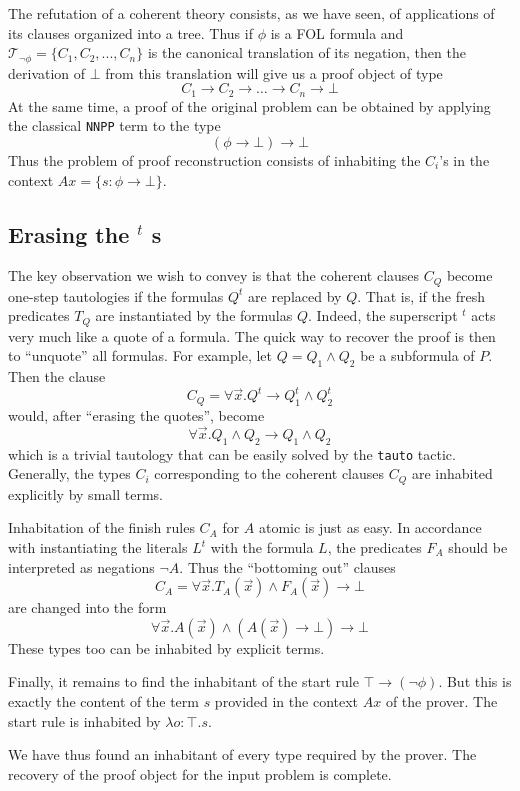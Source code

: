 \documentclass[a4paper,11pt]{article}
\begin{document}
The refutation of a coherent theory consists, as we have seen, of applications
of its clauses organized into a tree.  Thus if $\phi$ is a FOL formula and
$\mathcal T _{\lnot \phi} = \{C_1, C_2,..., C_n\}$ is the canonical translation of 
its negation, then the derivation of $\bot$ from this translation will give us 
a proof object of type
\[ C_1 \to C_2 \to \dots \to C_n \to \bot \]
At the same time, a proof of the original problem can be obtained by applying
the classical \verb|NNPP| term to the type
\[ (\phi \to \bot) \to \bot \]
Thus the problem of proof reconstruction consists of inhabiting the $C_i$'s in
the context $Ax = \{s: \phi \to \bot\}$.

\subsection{Erasing the ${ }^t$ s}

The key observation we wish to convey is that the coherent clauses $C_Q$
become one-step tautologies if the formulas $Q^t$ are replaced by $Q$. That is,
if the fresh predicates $T_Q$ are instantiated by the formulas $Q$. Indeed,
the superscript ${ }^t$ acts very much like a quote of a formula.  The quick
way to recover the proof is then to ``unquote'' all formulas.  For example,
let $Q = Q_1 \land Q_2$ be a subformula of $P$.  Then the clause
\[C_Q = \forall \vec x. Q^t \to Q^t_1 \land Q^t_2 \]
would, after ``erasing the quotes'', become
\[\forall \vec x.  Q_1 \land Q_2 \to Q_1 \land Q_2\]
which is a trivial tautology that can be easily solved by the \verb|tauto|
tactic.  Generally, the types $C_i$ corresponding to the coherent clauses
$C_Q$ are inhabited explicitly by small terms.

Inhabitation of the finish rules $C_A$ for $A$ atomic is just as easy.
In accordance with instantiating the literals $L^t$ with the formula $L$, 
the predicates $F_A$ should be interpreted as negations $\lnot A$.  Thus
the ``bottoming out'' clauses 
\[C_A = \forall \vec x. T_A(\vec x) \land F_A(\vec x) \to \bot\]
are changed into the form
\[ \forall \vec x. A(\vec x) \land (A(\vec x) \to \bot) \to \bot \]
These types too can be inhabited by explicit terms.

Finally, it remains to find the inhabitant of the start rule 
$\top \to (\lnot \phi)$.  But this is exactly the content of the term $s$
provided in the context $Ax$ of the prover.  The start rule is inhabited by
$\lambda o : \top. s$.

We have thus found an inhabitant of every type required by the prover.  The
recovery of the proof object for the input problem is complete.
\end{document}
